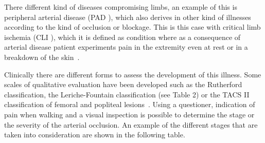 There different kind of diseases compromising limbs, an example of this is peripheral arterial disease (PAD ), which also derives in other kind of illnesses according to the kind of occlusion or blockage. This is this case with critical limb ischemia (CLI ), which it is defined as condition where as a consequence of arterial disease patient experiments pain in the extremity even at rest or in a breakdown of the skin~\cite{novo2004critical}. 

Clinically there are different forms to assess the development of this illness. Some scales of qualitative evaluation have been developed such as the Rutherford classification, the Leriche-Fountain classification (see Table 2) or the TACS II classification of femoral and popliteal lesions~\cite{norgren2007inter}. Using a questioner, indication of pain when walking and a visual inspection is possible to determine the stage or the severity of the arterial occlusion. An example of the different stages that are taken into consideration are shown in the following table. 

